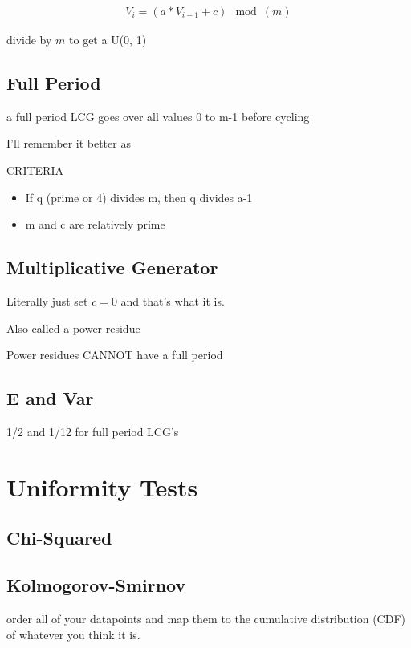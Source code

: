 \documentclass[fleqn]{report}
\newcommand{\equations} [1] {
\begin{gather*}
#1
\end{gather*}
}
\begin{document}
\equations{
    V_{i}
    =
    (a * V_{i - 1}
    + c)
    \mod (m)
}
divide by $m$ to get a U(0, 1)

\subsection{Full Period}
a full period LCG goes over all values 0 to m-1 before cycling 


I'll remember it better as 

CRITERIA 
\begin{itemize}
    \item
    If q (prime or 4) divides m, then q divides a-1
    \item
    m and c are relatively prime
\end{itemize}


\subsection{Multiplicative Generator}
Literally just set $c = 0$ and that's what it is. 

Also called a power residue 

Power residues CANNOT have a full period 

\subsection{E and Var}
1/2 and 1/12 for full period LCG's 

\section{Uniformity Tests}
\subsection{Chi-Squared}

\subsection{Kolmogorov-Smirnov}
order all of your datapoints and map them 
to the cumulative distribution (CDF) of whatever you think it is.
\end{document}

